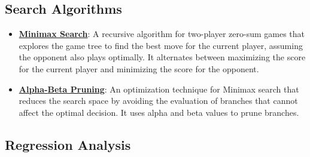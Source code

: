 \documentclass{article}%
\begin{document}
\subsection{Search Algorithms}%
\label{subsec:SearchAlgorithms}%
\begin{itemize}[leftmargin=*]%
\item \href{https://purdue.brightspace.com/d2l/common/assets/pdfjs-d2l-dist/1.0.14-legacy/web/viewer.html?file=\%2Fcontent\%2Fenforced\%2F1095467-wl.202510.CS.24300.001\%2F02L2-Intro.pdf\%3Fou\%3D1095467\&lang=en-us\&container=d2l-fileviewer-rendered-pdf\&fullscreen=d2l-fileviewer-rendered-pdf-dialog\&height=667#page=22}{\textbf{Minimax Search}}: A recursive algorithm for two{-}player zero{-}sum games that explores the game tree to find the best move for the current player, assuming the opponent also plays optimally. It alternates between maximizing the score for the current player and minimizing the score for the opponent.%
\item \href{https://purdue.brightspace.com/d2l/common/assets/pdfjs-d2l-dist/1.0.14-legacy/web/viewer.html?file=\%2Fcontent\%2Fenforced\%2F1095467-wl.202510.CS.24300.001\%2F02L2-Intro.pdf\%3Fou\%3D1095467\&lang=en-us\&container=d2l-fileviewer-rendered-pdf\&fullscreen=d2l-fileviewer-rendered-pdf-dialog\&height=667#page=23}{\textbf{Alpha{-}Beta Pruning}}: An optimization technique for Minimax search that reduces the search space by avoiding the evaluation of branches that cannot affect the optimal decision. It uses alpha and beta values to prune branches.%
\end{itemize}

%
\subsection{Regression Analysis}%
\label{subsec:RegressionAnalysis}%
\begin{itemize}[leftmargin=*]%
%
\end{itemize}

%
\end{document}

